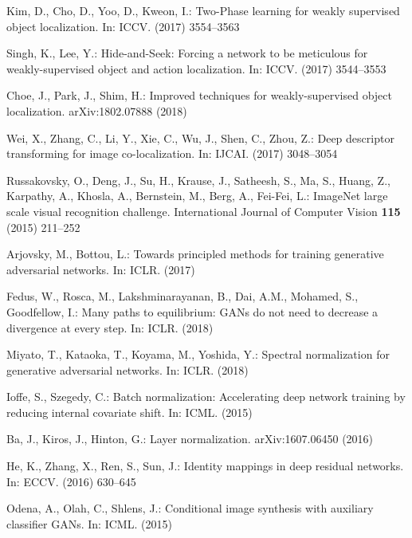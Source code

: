 \documentclass[runningheads]{llncs}
\begin{document}
\begin{thebibliography}{10}
Kim, D., Cho, D., Yoo, D., Kweon, I.:
\newblock Two-{P}hase learning for weakly supervised object localization.
\newblock In: ICCV. (2017)  3554--3563

Singh, K., Lee, Y.:
\newblock Hide-and-{S}eek: Forcing a network to be meticulous for
  weakly-supervised object and action localization.
\newblock In: ICCV. (2017)  3544--3553

Choe, J., Park, J., Shim, H.:
\newblock Improved techniques for weakly-supervised object localization.
\newblock arXiv:1802.07888 (2018)

Wei, X., Zhang, C., Li, Y., Xie, C., Wu, J., Shen, C., Zhou, Z.:
\newblock Deep descriptor transforming for image co-localization.
\newblock In: IJCAI. (2017)  3048--3054

Russakovsky, O., Deng, J., Su, H., Krause, J., Satheesh, S., Ma, S., Huang, Z.,
  Karpathy, A., Khosla, A., Bernstein, M., Berg, A., Fei-Fei, L.:
\newblock Image{N}et large scale visual recognition challenge.
\newblock International Journal of Computer Vision \textbf{115} (2015)
  211--252

Arjovsky, M., Bottou, L.:
\newblock Towards principled methods for training generative adversarial
  networks.
\newblock In: ICLR. (2017)

Fedus, W., Rosca, M., Lakshminarayanan, B., Dai, A.M., Mohamed, S., Goodfellow,
  I.:
\newblock Many paths to equilibrium: {G}{A}{N}s do not need to decrease a
  divergence at every step.
\newblock In: ICLR. (2018)

Miyato, T., Kataoka, T., Koyama, M., Yoshida, Y.:
\newblock Spectral normalization for generative adversarial networks.
\newblock In: ICLR. (2018)

Ioffe, S., Szegedy, C.:
\newblock Batch normalization: Accelerating deep network training by reducing
  internal covariate shift.
\newblock In: ICML. (2015)

Ba, J., Kiros, J., Hinton, G.:
\newblock Layer normalization.
\newblock arXiv:1607.06450 (2016)

He, K., Zhang, X., Ren, S., Sun, J.:
\newblock Identity mappings in deep residual networks.
\newblock In: ECCV. (2016)  630--645

Odena, A., Olah, C., Shlens, J.:
\newblock Conditional image synthesis with auxiliary classifier {G}{A}{N}s.
\newblock In: ICML. (2015)

\end{thebibliography}
\end{document}
